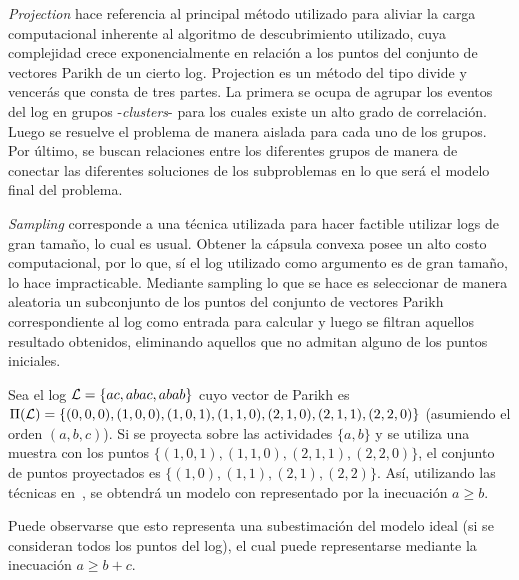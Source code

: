 \begin{remark}[Projection]
    \textit{Projection} hace referencia al principal método utilizado para aliviar la carga
    computacional inherente al algoritmo de descubrimiento utilizado, cuya complejidad
    crece exponencialmente en relación a los puntos del conjunto de vectores Parikh de un cierto
    log. Projection es un método del tipo divide y vencerás que consta de tres partes. 
    La primera se ocupa de agrupar los eventos del log en grupos -\textit{clusters}-
    para los cuales existe un alto grado de correlación. 
    Luego se resuelve el problema de manera aislada para cada uno de los grupos.
    Por último, se buscan relaciones entre los diferentes grupos de manera de 
    conectar las diferentes soluciones de los subproblemas en lo que será
    el modelo final del problema.
\end{remark}

\begin{remark}[Sampling]
    \textit{Sampling} corresponde a una técnica utilizada para hacer factible utilizar
    logs de gran tamaño, lo cual es usual.
    Obtener la cápsula convexa posee un alto costo computacional, por lo que, sí el log utilizado
    como argumento es de gran tamaño, lo hace impracticable.
    Mediante sampling lo que se hace es seleccionar de manera aleatoria un subconjunto de los
    puntos del conjunto de vectores Parikh correspondiente al log como entrada para calcular y 
    luego se filtran aquellos resultado obtenidos, eliminando aquellos que no admitan alguno 
    de los puntos iniciales.
\end{remark}

\begin{example}
    Sea el log ${\mathcal L}=\{ ac, abac, abab \}$ cuyo vector de Parikh es 
    $\Pi({\mathcal L})=\{ (0,0,0),(1,0,0), (1,0,1),\\(1,1,0), (2,1,0), (2,1,1),(2,2,0) \}$ (asumiendo el orden $(a,b,c)$).
    Si se proyecta sobre las actividades $\{a,b\}$ y se utiliza una muestra con los puntos
    $\{(1,0,1),(1,1,0),(2,1,1),(2,2,0)\}$, el conjunto de puntos proyectados es
    $\{ (1,0), (1,1), (2,1), (2,2) \}$. 
    Así, utilizando las técnicas en~\cite{CarmonaC14}, se obtendrá un modelo con
    representado por la inecuación \mbox{$a \ge b$}.
    
    Puede observarse que esto representa una subestimación del modelo ideal (si se consideran
    todos los puntos del log), el cual puede representarse mediante la inecuación $a \ge b + c$.
\end{example}

